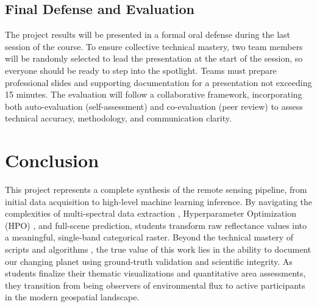 \documentclass{article}
\begin{document}
\subsection*{Final Defense and Evaluation}
The project results will be presented in a formal oral defense during the last session of the course. To ensure collective technical mastery, two team members will be randomly selected to lead the presentation at the start of the session, so everyone should be ready to step into the spotlight. Teams must prepare professional slides and supporting documentation for a presentation not exceeding 15 minutes. The evaluation will follow a collaborative framework, incorporating both auto-evaluation (self-assessment) and co-evaluation (peer review) to assess technical accuracy, methodology, and communication clarity.

\section{Conclusion}
This project represents a complete synthesis of the remote sensing pipeline, from initial data acquisition to high-level machine learning inference. By navigating the complexities of multi-spectral data extraction , Hyperparameter Optimization (HPO) , and full-scene prediction, students transform raw reflectance values into a meaningful, single-band categorical raster.  Beyond the technical mastery of scripts and algorithms , the true value of this work lies in the ability to document our changing planet using ground-truth validation and scientific integrity. As students finalize their thematic visualizations and quantitative area assessments, they transition from being observers of environmental flux to active participants in the modern geospatial landscape.
\end{document}
